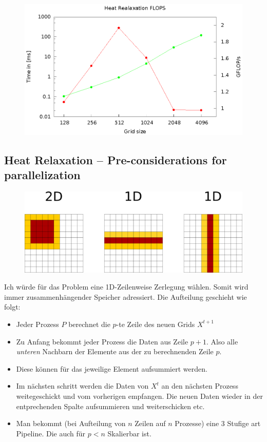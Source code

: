 \documentclass[a4paper,11pt]{scrartcl}
\begin{document}
\begin{figure}[htbp]
\includegraphics[width=\linewidth,
keepaspectratio]{plot.eps}
\centering
\end{figure}

\subsection{Heat Relaxation – Pre-considerations for parallelization}

\begin{figure}[htbp]
\includegraphics[width=0.7\linewidth,
keepaspectratio]{decomp1.png}
\centering
\end{figure}

Ich würde für das Problem eine 1D-Zeilenweise Zerlegung wählen. Somit wird immer zusammenhängender Speicher adressiert. Die Aufteilung geschieht wie folgt:
\begin{itemize}
    \item Jeder Prozess $P$ berechnet die $p$-te Zeile des neuen Grids $X^{t+1}$
    \item Zu Anfang bekommt jeder Prozess die Daten aus Zeile $p+1$. Also alle \emph{unteren} Nachbarn der Elemente aus der zu berechnenden Zeile $p$.
    \item Diese können für das jeweilige Element aufsummiert werden.
    \item Im nächsten schritt werden die Daten von $X^{t}$ an den nächsten Prozess weitegeschickt und vom vorherigen empfangen. Die neuen Daten wieder in der entprechenden Spalte aufsummieren und weiterschicken etc.
    \item Man bekommt (bei Aufteilung von $n$ Zeilen auf $n$ Prozesse) eine 3 Stufige art Pipeline. Die auch für $p<n$ Skalierbar ist. 
\end{itemize}
\end{document}
